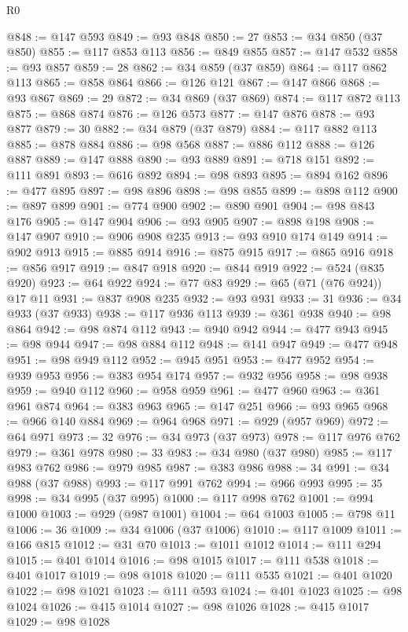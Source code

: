 \begin{lexlean}{R0}
\begin{coremodule}
@848 := @147 @593
@849 := @93 @848
@850 := 27
@853 := @34 @850 (@37 @850)
@855 := @117 @853 @113
@856 := @849 @855
@857 := @147 @532
@858 := @93 @857
@859 := 28
@862 := @34 @859 (@37 @859)
@864 := @117 @862 @113
@865 := @858 @864
@866 := @126 @121
@867 := @147 @866
@868 := @93 @867
@869 := 29
@872 := @34 @869 (@37 @869)
@874 := @117 @872 @113
@875 := @868 @874
@876 := @126 @573
@877 := @147 @876
@878 := @93 @877
@879 := 30
@882 := @34 @879 (@37 @879)
@884 := @117 @882 @113
@885 := @878 @884
@886 := @98 @568
@887 := @886 @112
@888 := @126 @887
@889 := @147 @888
@890 := @93 @889
@891 := @718 @151
@892 := @111 @891
@893 := @616 @892
@894 := @98 @893
@895 := @894 @162
@896 := @477 @895
@897 := @98 @896
@898 := @98 @855
@899 := @898 @112
@900 := @897 @899
@901 := @774 @900
@902 := @890 @901
@904 := @98 @843 @176
@905 := @147 @904
@906 := @93 @905
@907 := @898 @198
@908 := @147 @907
@910 := @906 @908 @235
@913 := @93 @910 @174 @149
@914 := @902 @913
@915 := @885 @914
@916 := @875 @915
@917 := @865 @916
@918 := @856 @917
@919 := @847 @918
@920 := @844 @919
@922 := @524 (@835 @920)
@923 := @64 @922
@924 := @77 @83
@929 := @65 (@71 (@76 @924)) @17 @11
@931 := @837 @908 @235
@932 := @93 @931
@933 := 31
@936 := @34 @933 (@37 @933)
@938 := @117 @936 @113
@939 := @361 @938
@940 := @98 @864
@942 := @98 @874 @112
@943 := @940 @942
@944 := @477 @943
@945 := @98 @944
@947 := @98 @884 @112
@948 := @141 @947
@949 := @477 @948
@951 := @98 @949 @112
@952 := @945 @951
@953 := @477 @952
@954 := @939 @953
@956 := @383 @954 @174
@957 := @932 @956
@958 := @98 @938
@959 := @940 @112
@960 := @958 @959
@961 := @477 @960
@963 := @361 @961 @874
@964 := @383 @963
@965 := @147 @251
@966 := @93 @965
@968 := @966 @140 @884
@969 := @964 @968
@971 := @929 (@957 @969)
@972 := @64 @971
@973 := 32
@976 := @34 @973 (@37 @973)
@978 := @117 @976 @762
@979 := @361 @978
@980 := 33
@983 := @34 @980 (@37 @980)
@985 := @117 @983 @762
@986 := @979 @985
@987 := @383 @986
@988 := 34
@991 := @34 @988 (@37 @988)
@993 := @117 @991 @762
@994 := @966 @993
@995 := 35
@998 := @34 @995 (@37 @995)
@1000 := @117 @998 @762
@1001 := @994 @1000
@1003 := @929 (@987 @1001)
@1004 := @64 @1003
@1005 := @798 @11
@1006 := 36
@1009 := @34 @1006 (@37 @1006)
@1010 := @117 @1009
@1011 := @166 @815
@1012 := @31 @70
@1013 := @1011 @1012
@1014 := @111 @294
@1015 := @401 @1014
@1016 := @98 @1015
@1017 := @111 @538
@1018 := @401 @1017
@1019 := @98 @1018
@1020 := @111 @535
@1021 := @401 @1020
@1022 := @98 @1021
@1023 := @111 @593
@1024 := @401 @1023
@1025 := @98 @1024
@1026 := @415 @1014
@1027 := @98 @1026
@1028 := @415 @1017
@1029 := @98 @1028

\end{coremodule}
\end{lexlean}
